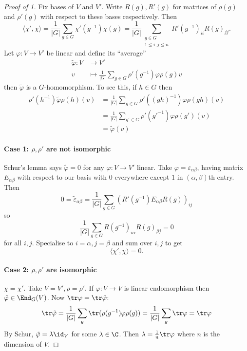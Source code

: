 \documentclass[a4paper]{article}
\begin{document}
\begin{proof}[Proof of  1]
  Fix bases of \(V\) and \(V'\). Write \(R(g), R'(g)\) for matrices of \(\rho(g)\) and \(\rho'(g)\) with respect to these bases respectively. Then
  \[
    \langle \chi', \chi \rangle
    = \frac{1}{|G|} \sum_{g \in G} \chi'(g^{-1}) \chi(g)
    = \frac{1}{|G|} \sum_{\substack{g \in G \\ 1 \leq i, j \leq n}} R'(g^{-1})_{ii} R(g)_{jj}.
  \]
  Let \(\varphi: V \to V'\) be linear and define its ``average''
  \begin{align*}
    \tilde \varphi: V &\to V' \\
    v &\mapsto \frac{1}{|G|} \sum_{g \in G} \rho'(g^{-1}) \varphi \rho(g) v
  \end{align*}
  then \(\tilde \varphi\) is a \(G\)-homomorphism. To see this, if \(h \in G\) then
  \begin{align*}
    \rho'(h^{-1}) \tilde \varphi \rho(h) (v)
    &= \frac{1}{|G|} \sum_{g \in G} \rho'((gh)^{-1}) \varphi \rho(gh) (v) \\
    &= \frac{1}{|G|} \sum_{g' \in G} \rho'(g'^{-1}) \varphi \rho(g') (v) \\
    &= \tilde \varphi(v)
  \end{align*}
  
\paragraph{Case 1: \(\rho, \rho'\) are not isomorphic}

Schur's lemma says \(\tilde \varphi = 0\) for any \(\varphi: V \to V'\) linear. Take \(\varphi = \varepsilon_{\alpha\beta}\), having matrix \(E_{\alpha\beta}\) with respect to our basis with \(0\) everywhere except \(1\) in \((\alpha, \beta)\)th entry. Then
\[
  0 = \tilde \varepsilon_{\alpha\beta}
  = \frac{1}{|G|} \sum_{g \in G} (R'(g^{-1}) E_{\alpha\beta} R(g))_{ij}
\]
so
\[
  \frac{1}{|G|} \sum_{g \in G} R(g^{-1})_{i\alpha} R(g)_{\beta j} = 0
\]
for all \(i, j\). Specialise to \(i = \alpha, j = \beta\) and sum over \(i, j\) to get
\[
  \langle \chi', \chi \rangle = 0.
\]

\paragraph{Case 2: \(\rho, \rho'\) are isomorphic}

\(\chi = \chi'\). Take \(V = V', \rho = \rho'\). If \(\varphi: V \to V\) is linear endomorphism then \(\tilde \varphi \in \End_G(V)\). Now \(\tr \varphi = \tr \tilde \varphi\):
\[
  \tr \tilde \varphi
  = \frac{1}{|G|} \sum_g \tr(\rho(g^{-1}) \varphi \rho(g))
  = \frac{1}{|G|} \sum_g \tr \varphi
  = \tr \varphi
\]
By Schur, \(\tilde \varphi = \lambda \id_V\) for some \(\lambda \in \C\). Then \(\lambda = \frac{1}{n} \tr \varphi\) where \(n\) is the dimension of \(V\).


\end{proof}
\end{document}
